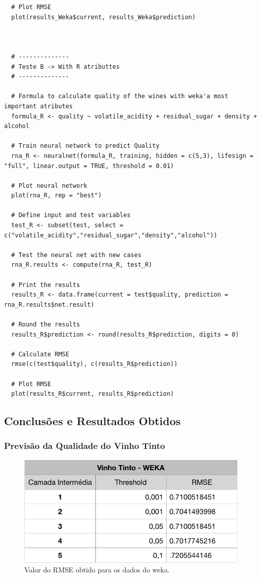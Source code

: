\documentclass{report}
\begin{document}
\begin{verbatim}
  # Plot RMSE
  plot(results_Weka$current, results_Weka$prediction)


  
  # --------------
  #	Teste B	-> With R atributtes
  # --------------
  
  # Formula to calculate quality of the wines with weka'a most important atributes
  formula_R <- quality ~ volatile_acidity + residual_sugar + density + alcohol
  
  # Train neural network to predict Quality
  rna_R <- neuralnet(formula_R, training, hidden = c(5,3), lifesign = "full", linear.output = TRUE, threshold = 0.01)
  
  # Plot neural network
  plot(rna_R, rep = "best")
  
  # Define input and test variables
  test_R <- subset(test, select = c("volatile_acidity","residual_sugar","density","alcohol"))
  
  # Test the neural net with new cases
  rna_R.results <- compute(rna_R, test_R)
  
  # Print the results
  results_R <- data.frame(current = test$quality, prediction = rna_R.results$net.result)
  
  # Round the results
  results_R$prediction <- round(results_R$prediction, digits = 0)
  
  # Calculate RMSE
  rmse(c(test$quality), c(results_R$prediction))
  
  # Plot RMSE
  plot(results_R$current, results_R$prediction)
\end{verbatim}



\subsection{Conclusões e Resultados Obtidos}

\subsubsection{Previsão da Qualidade do Vinho Tinto}

\begin{figure}[h!]
\centering
\includegraphics[scale=0.5]{tabelas/1} 
\caption{Valor do RMSE obtido para os dados do weka.}
\end{figure}
\end{document}

